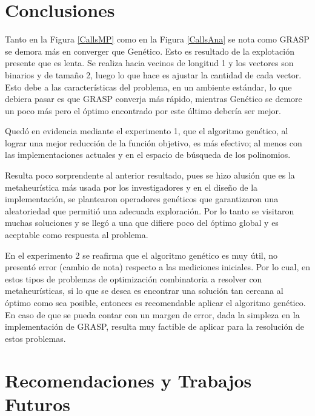 \documentclass[a4paper,openright,11pt,oneside]{book}
\begin{document}
	\section{Conclusiones}
	
	Tanto en la Figura \ref{CallsMP} como en la Figura \ref{CallsAna} se nota como GRASP se demora más en converger que Genético. Esto es resultado de la explotación presente que es lenta. Se realiza hacia vecinos de longitud 1 y los vectores son binarios y de tamaño 2, luego lo que hace es ajustar la cantidad de cada vector. Esto debe a las características del problema, en un ambiente estándar, lo que debiera pasar es que GRASP converja más rápido, mientras Genético se demore un poco más pero el óptimo encontrado por este último debería ser mejor.
	
	Quedó en evidencia mediante el experimento 1, que el algoritmo genético, al lograr una mejor reducción de la función objetivo, es más efectivo; al menos con las implementaciones actuales y en el espacio de búsqueda de los polinomios.
	
	Resulta poco sorprendente al anterior resultado, pues se hizo alusión que es la metaheurística más usada por los investigadores y en el diseño de la implementación, se plantearon operadores genéticos que garantizaron una aleatoriedad que permitió una adecuada exploración. Por lo tanto se visitaron muchas soluciones y se llegó a una que difiere poco del óptimo global y es aceptable como respuesta al problema.
	
	En el experimento 2 se reafirma que el algoritmo genético es muy útil, no presentó error (cambio de nota) respecto a las mediciones iniciales. Por lo cual, en estos tipos de problemas de optimización combinatoria a resolver con metaheurísticas, si lo que se desea es encontrar una solución tan cercana al óptimo como sea posible, entonces es recomendable aplicar el algoritmo genético. En caso de que se pueda contar con un margen de error, dada la simpleza en la implementación de GRASP, resulta muy factible de aplicar para la resolución de estos problemas.
	
	\section*{Recomendaciones y Trabajos Futuros}
	
\end{document}
